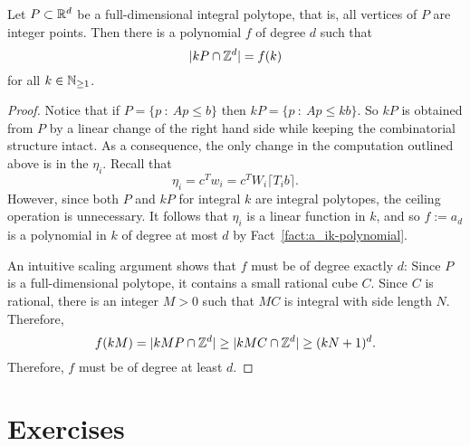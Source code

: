 \begin{theorem}
  Let $P \subset \mathbb{R}^d$ be a full-dimensional integral polytope,
  that is, all vertices of $P$ are integer points.
  Then there is a polynomial $f$ of degree $d$
  such that
  \[
    |kP \cap \mathbb{Z}^d| = f(k)
  \]
  for all $k \in \mathbb{N}_{\geq 1}$.
\end{theorem}
\begin{proof}
  Notice that if $P = \{ p ~:~ Ap \leq b \}$ then $kP = \{ p ~:~ Ap \leq kb \}$.
  So $kP$ is obtained from $P$ by a linear change of the right hand side while keeping the combinatorial structure intact.
  As a consequence, the only change in the computation outlined above is in the $\eta_i$.
  Recall that
  \[
    \eta_i = c^T w_i = c^T W_i \lceil T_i b \rceil.
  \]
  However, since both $P$ and $kP$ for integral $k$ are integral polytopes,
  the ceiling operation is unnecessary.
  It follows that $\eta_i$ is a linear function in $k$,
  and so $f := a_d$ is a polynomial in $k$ of degree at most $d$ by Fact~\ref{fact:a_ik-polynomial}.

  An intuitive scaling argument shows that $f$ must be of degree exactly $d$:
  Since $P$ is a full-dimensional polytope, it contains a small rational cube $C$.
  Since $C$ is rational, there is an integer $M > 0$ such that $MC$ is integral with side length $N$.
  Therefore,
  \[
    f(kM) = |kM P \cap \mathbb{Z}^d| \geq |kMC \cap \mathbb{Z}^d| \geq (kN + 1)^d.
  \]
  Therefore, $f$ must be of degree at least $d$.
\end{proof}









\section*{Exercises}

